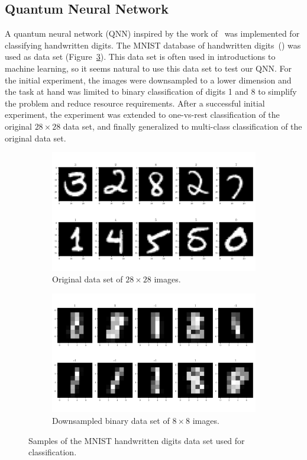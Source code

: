 \documentclass[a4paper,10pt]{article}
\begin{document}
\subsection{Quantum Neural Network}
A quantum neural network (QNN) inspired by the work of~\textcite{qnn-near-term} was implemented for classifying handwritten digits.
The MNIST database of handwritten digits~(\cite{mnist-digits}) was used as data set (Figure~\ref{fig:mnist}).
This data set is often used in introductions to machine learning, so it seems natural to use this data set to test our QNN.
For the initial experiment, the images were downsampled to a lower dimension and the task at hand was limited to binary classification of digits 1 and 8 to simplify the problem and reduce resource requirements.
After a successful initial experiment, the experiment was extended to one-vs-rest classification of the original $28 \times 28$ data set, and finally generalized to multi-class classification of the original data set.
\begin{figure}[ht]
	\centering
	\begin{subfigure}{.5\textwidth}
		\centering
		\includegraphics[width=.925\linewidth]{figures/mnist_28x28.pdf}
		\caption{Original data set of $28 \times 28$ images.}
		\label{fig:mnist_28x28}
	\end{subfigure}%
	\begin{subfigure}{.5\textwidth}
		\centering
		\includegraphics[width=.925\linewidth]{figures/mnist_8x8.pdf}
		\caption{Downsampled binary data set of $8 \times 8$ images.}
		\label{fig:mnist_8x8}
	\end{subfigure}
	\caption{Samples of the MNIST handwritten digits data set used for classification.}
	\label{fig:mnist}
\end{figure}
\end{document}
